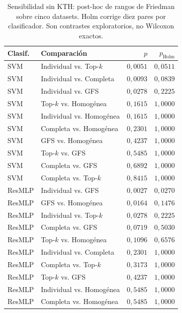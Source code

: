 \begin{table}[!htbp]
\centering\fontsize{8}{10}\selectfont
\caption{Sensibilidad sin KTH: post-hoc de rangos de Friedman sobre cinco datasets. Holm corrige diez pares por clasificador. Son contrastes exploratorios, no Wilcoxon exactos.}
\label{tab:kth-sensibilidad-holm}
\begin{tabular}{@{}llrr@{}}
\toprule
Clasif. & Comparación & $p$ & $p_{\mathrm{Holm}}$\\
\midrule
SVM & Individual vs. Top-$k$ & $0{,}0051$ & $0{,}0511$\\
SVM & Individual vs. Completa & $0{,}0093$ & $0{,}0839$\\
SVM & Individual vs. GFS & $0{,}0278$ & $0{,}2225$\\
SVM & Top-$k$ vs. Homogénea & $0{,}1615$ & $1{,}0000$\\
SVM & Individual vs. Homogénea & $0{,}1615$ & $1{,}0000$\\
SVM & Completa vs. Homogénea & $0{,}2301$ & $1{,}0000$\\
SVM & GFS vs. Homogénea & $0{,}4237$ & $1{,}0000$\\
SVM & Top-$k$ vs. GFS & $0{,}5485$ & $1{,}0000$\\
SVM & Completa vs. GFS & $0{,}6892$ & $1{,}0000$\\
SVM & Completa vs. Top-$k$ & $0{,}8415$ & $1{,}0000$\\
ResMLP & Individual vs. GFS & $0{,}0027$ & $0{,}0270$\\
ResMLP & GFS vs. Homogénea & $0{,}0164$ & $0{,}1476$\\
ResMLP & Individual vs. Top-$k$ & $0{,}0278$ & $0{,}2225$\\
ResMLP & Completa vs. GFS & $0{,}0719$ & $0{,}5030$\\
ResMLP & Top-$k$ vs. Homogénea & $0{,}1096$ & $0{,}6576$\\
ResMLP & Individual vs. Completa & $0{,}2301$ & $1{,}0000$\\
ResMLP & Completa vs. Top-$k$ & $0{,}3173$ & $1{,}0000$\\
ResMLP & Top-$k$ vs. GFS & $0{,}4237$ & $1{,}0000$\\
ResMLP & Individual vs. Homogénea & $0{,}5485$ & $1{,}0000$\\
ResMLP & Completa vs. Homogénea & $0{,}5485$ & $1{,}0000$\\
\bottomrule
\end{tabular}
\end{table}
